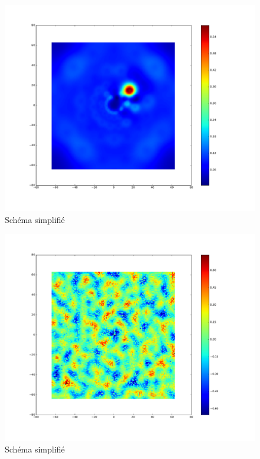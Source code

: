 \begin{figure}[th]
\centering
\includegraphics[scale=0.4]{Figures/accuracy_128_LP}
\decoRule %
\caption[Figure]{Schéma simplifié}
\label{fig:accuracy_128_LP}
\end{figure}

\begin{figure}[th]
\centering
\includegraphics[scale=0.4]{Figures/perlin_noise}
\decoRule %
\caption[Figure]{Schéma simplifié}
\label{fig:perlin_noise}
\end{figure}

